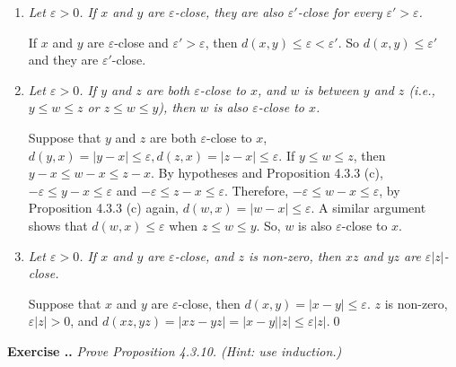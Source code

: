 \documentclass{book}
\newcounter{Exercise}[section]
\renewcommand{\theExercise}{\thesection.\arabic{Exercise}.}
\newcommand{\new}{\vspace{1.5em}\noindent\textbf{{Exercise \stepcounter{Exercise}\textbf{\theExercise}}} }
\begin{document}
\begin{enumerate}
    \item \emph{Let $\varepsilon>0$. If $x$ and $y$ are $\varepsilon$-close, they are also $\varepsilon'$-close for every $\varepsilon'>\varepsilon$.}

    If $x$ and $y$ are $\varepsilon$-close and $\varepsilon'>\varepsilon$, then $d(x,y)\leq\varepsilon<\varepsilon'$. So $d(x,y)\leq\varepsilon'$ and they are $\varepsilon'$-close.

    \item \emph{Let $\varepsilon>0$. If $y$ and $z$ are both $\varepsilon$-close to $x$, and $w$ is between $y$ and $z$ (i.e., $y\leq w\leq z$ or $z\leq w\leq y$), then $w$ is also $\varepsilon$-close to $x$.}

    Suppose that $y$ and $z$ are both $\varepsilon$-close to $x$, $d(y,x)=|y-x|\leq\varepsilon,d(z,x)=|z-x|\leq\varepsilon$. If $y\leq w\leq z$, then $y-x\leq w-x\leq z-x$. By hypotheses and Proposition 4.3.3 (c), $-\varepsilon\leq y-x\leq\varepsilon$ and $-\varepsilon\leq z-x\leq\varepsilon$. Therefore, $-\varepsilon\leq w-x\leq\varepsilon$, by Proposition 4.3.3 (c) again, $d(w,x)=|w-x|\leq\varepsilon$. A similar argument shows that $d(w,x)\leq\varepsilon$ when $z\leq w\leq y$. So, $w$ is also $\varepsilon$-close to $x$.

    \item \emph{Let $\varepsilon>0$. If $x$ and $y$ are $\varepsilon$-close, and $z$ is non-zero, then $xz$ and $yz$ are $\varepsilon|z|$-close.}

    Suppose that $x$ and $y$ are $\varepsilon$-close, then $d(x,y)=|x-y|\leq\varepsilon$. $z$ is non-zero, $\varepsilon|z|>0$, and $d(xz,yz)=|xz-yz|=|x-y||z|\leq\varepsilon|z|$.\qed
    
\end{enumerate}

\new\emph{Prove Proposition 4.3.10. (Hint: use induction.)}
\end{document}
